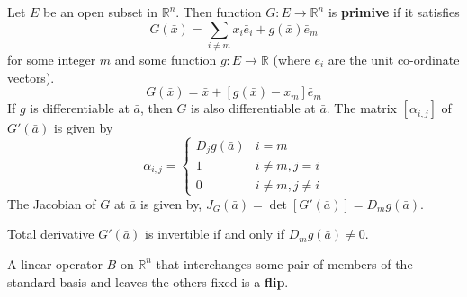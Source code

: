 \begin{definition}
	Let $E$ be an open subset in $\mathbb{R}^n$.
	Then function $G : E \to \mathbb{R}^n$ is \textbf{primive}
	if it satisfies
	\begin{equation}
		G(\bar{x}) = \sum_{i \ne m} x_i \bar{e}_i + g(\bar{x})\bar{e}_m
	\end{equation}
	for some integer $m$ and
	some function $g : E \to \mathbb{R}$
	(where $\bar{e}_i$ are the unit co-ordinate vectors).
	\begin{equation}
		G(\bar{x}) = \bar{x} + [g(\bar{x})-x_m]\bar{e}_m
	\end{equation}
	If $g$ is differentiable at $\bar{a}$, then $G$ is also differentiable at $\bar{a}$.
	The matrix $[\alpha_{i,j}]$ of $G'(\bar{a})$ is given by 
	\[ \alpha_{i,j} = \begin{cases} 
		D_jg(\bar{a}) & i = m\\
		1 & i \ne m, j = i \\
		0 & i \ne m, j \ne i
	\end{cases} \]
	The Jacobian of $G$ at $\bar{a}$ is given by,
	$J_G(\bar{a}) = \det[G'(\bar{a})] = D_mg(\bar{a})$.

	Total derivative $G'(\bar{a})$ is invertible if and only if $D_mg(\bar{a}) \ne 0$.
\end{definition}

\begin{definition}
	A linear operator $B$ on $\mathbb{R}^n$ that interchanges some pair of members of the standard basis and leaves the others fixed is a \textbf{flip}.
\end{definition}

